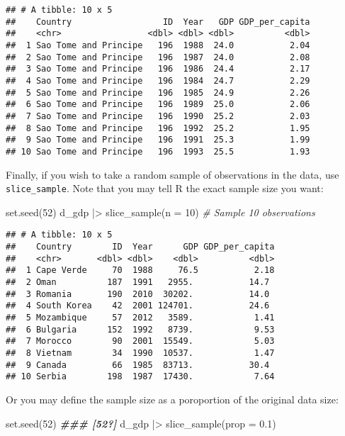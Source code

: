 \documentclass[
]{article}
\newenvironment{Shaded}{\begin{snugshade}}{\end{snugshade}}
\newcommand{\AttributeTok}[1]{\textcolor[rgb]{0.77,0.63,0.00}{#1}}
\newcommand{\CommentTok}[1]{\textcolor[rgb]{0.56,0.35,0.01}{\textit{#1}}}
\newcommand{\DecValTok}[1]{\textcolor[rgb]{0.00,0.00,0.81}{#1}}
\newcommand{\DocumentationTok}[1]{\textcolor[rgb]{0.56,0.35,0.01}{\textbf{\textit{#1}}}}
\newcommand{\FloatTok}[1]{\textcolor[rgb]{0.00,0.00,0.81}{#1}}
\newcommand{\FunctionTok}[1]{\textcolor[rgb]{0.00,0.00,0.00}{#1}}
\newcommand{\NormalTok}[1]{#1}
\newcommand{\SpecialCharTok}[1]{\textcolor[rgb]{0.00,0.00,0.00}{#1}}
\begin{document}
\begin{verbatim}
## # A tibble: 10 x 5
##    Country                  ID  Year   GDP GDP_per_capita
##    <chr>                 <dbl> <dbl> <dbl>          <dbl>
##  1 Sao Tome and Principe   196  1988  24.0           2.04
##  2 Sao Tome and Principe   196  1987  24.0           2.08
##  3 Sao Tome and Principe   196  1986  24.4           2.17
##  4 Sao Tome and Principe   196  1984  24.7           2.29
##  5 Sao Tome and Principe   196  1985  24.9           2.26
##  6 Sao Tome and Principe   196  1989  25.0           2.06
##  7 Sao Tome and Principe   196  1990  25.2           2.03
##  8 Sao Tome and Principe   196  1992  25.2           1.95
##  9 Sao Tome and Principe   196  1991  25.3           1.99
## 10 Sao Tome and Principe   196  1993  25.5           1.93
\end{verbatim}

Finally, if you wish to take a random sample of observations in the
data, use \texttt{slice\_sample}. Note that you may tell R the exact
sample size you want:

\begin{Shaded}
\begin{Highlighting}[]
\FunctionTok{set.seed}\NormalTok{(}\DecValTok{52}\NormalTok{)}
\NormalTok{d\_gdp }\SpecialCharTok{|\textgreater{}} \FunctionTok{slice\_sample}\NormalTok{(}\AttributeTok{n =} \DecValTok{10}\NormalTok{) }\CommentTok{\# Sample 10 observations}
\end{Highlighting}
\end{Shaded}

\begin{verbatim}
## # A tibble: 10 x 5
##    Country        ID  Year      GDP GDP_per_capita
##    <chr>       <dbl> <dbl>    <dbl>          <dbl>
##  1 Cape Verde     70  1988     76.5           2.18
##  2 Oman          187  1991   2955.           14.7 
##  3 Romania       190  2010  30202.           14.0 
##  4 South Korea    42  2001 124701.           24.6 
##  5 Mozambique     57  2012   3589.            1.41
##  6 Bulgaria      152  1992   8739.            9.53
##  7 Morocco        90  2001  15549.            5.03
##  8 Vietnam        34  1990  10537.            1.47
##  9 Canada         66  1985  83713.           30.4 
## 10 Serbia        198  1987  17430.            7.64
\end{verbatim}

Or you may define the sample size as a poroportion of the original data
size:

\begin{Shaded}
\begin{Highlighting}[]
\FunctionTok{set.seed}\NormalTok{(}\DecValTok{52}\NormalTok{) }\DocumentationTok{\#\#\# [52?]}
\NormalTok{d\_gdp }\SpecialCharTok{|\textgreater{}} \FunctionTok{slice\_sample}\NormalTok{(}\AttributeTok{prop =} \FloatTok{0.1}\NormalTok{)}
\end{Highlighting}
\end{Shaded}
\end{document}
